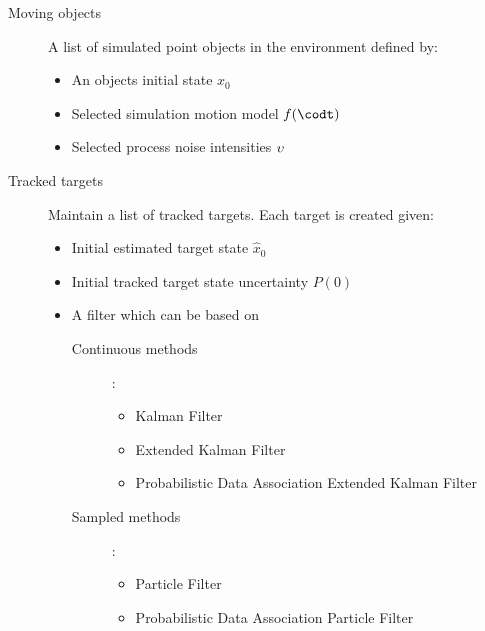 \begin{description}
	\item[Moving objects] A list of simulated point objects in the environment defined by:
	\begin{itemize}
		\item An objects initial state $x_0$
		\item Selected simulation motion model $f(\codt)$
		\item Selected process noise intensities $ {\upsilon} $
	\end{itemize}
\end{description}

\begin{description}
	\item[Tracked targets] Maintain a list of tracked targets. Each target is created given:
	\begin{itemize}
		\item Initial estimated target state $\hat{x}_0$
		\item Initial tracked target state uncertainty $P(0)$
		\item A filter which can be based on
			\begin{description}
				\item[Continuous methods]:
					\begin{itemize}
						\item Kalman Filter
						\item Extended Kalman Filter
						\item Probabilistic Data Association Extended Kalman Filter
					\end{itemize}		
			\end{description}
			\begin{description}
				\item[Sampled methods]:
					\begin{itemize}
						\item Particle Filter
						\item Probabilistic Data Association Particle Filter
					\end{itemize}
			\end{description}			
	\end{itemize}
\end{description}


